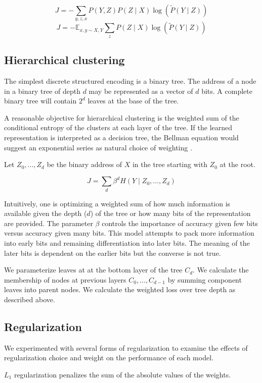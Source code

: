 \documentclass[11pt,letterpaper]{article}
\begin{document}
$$ J = - \sum_{y,z,x} P(Y, Z) P(Z \mid X) \log( \tilde{P}(Y \mid Z)) $$
$$ J = - \mathbb{E}_{x,y \sim X, Y} \sum_{z} P(Z \mid X) \log( \tilde{P}(Y \mid Z)) $$

\subsection{Hierarchical clustering}

The simplest discrete structured encoding is a binary tree. The address of a node in a binary tree of depth $d$ may be represented as a vector of $d$ bits. A complete binary tree will contain $2^d$ leaves at the base of the tree.

A reasonable objective for hierarchical clustering is the weighted sum of the conditional entropy of the clusters at each layer of the tree. If the learned representation is interpreted as a decision tree, the Bellman equation would suggest an exponential series as natural choice of weighting \cite{bellman1954}.

Let $Z_0,...,Z_d$ be the binary address of $X$ in the tree starting with $Z_0$ at the root.

$$ J = \sum_d \beta ^ d  H(Y \mid Z_0,\ldots, Z_d) $$

Intuitively, one is optimizing a weighted sum of how much information is available given the depth ($d$) of the tree or how many bits of the representation are provided. The parameter $\beta$ controls the importance of accuracy given few bits versus accuracy given many bits. This model attempts to pack more information into early bits and remaining differentiation into later bits. The meaning of the later bits is dependent on the earlier bits but the converse is not true.

We parameterize leaves at at the bottom layer of the tree $C_d$. We calculate the membership of nodes at previous layers $C_0,...,C_{d-1}$ by summing component leaves into parent nodes. We calculate the weighted loss over tree depth as described above.

\subsection{Regularization}

We experimented with several forms of regularization to examine the effects of regularization choice and weight on the performance of each model.

$L_1$ regularization penalizes the sum of the absolute values of the weights.
\end{document}
